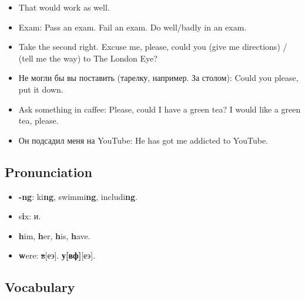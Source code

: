 \documentclass[10pt,a4paper]{article}
\newlength{\OriginalParIndent}
\newenvironment{ItemizeWithOrigParIndent}
    {\begin{itemize}[leftmargin=\OriginalParIndent]}
    {\end{itemize}}
\begin{document}
\begin{ItemizeWithOrigParIndent}
  \item That would work as well.
  \item Exam: Pass an exam. Fail an exam. Do well/badly in an exam.
  \item Take the second right. Excuse me, please, could you (give me directions) /
        (tell me the way) to The London Eye?
  \item Не могли бы вы поставить (тарелку, например. За столом): Could you please, put it down.
  \item Ask something in caffee: Please, could I have a green tea? I would like a green tea, please.
  \item Он подсадил меня на YouTube: He has got me addicted to YouTube.
\end{ItemizeWithOrigParIndent}



\subsection{Pronunciation}
\begin{ItemizeWithOrigParIndent}
  \item \textbf{-ng}: ki\textbf{ng}, swimmi\textbf{ng}, includi\textbf{ng}.
  \item s\textbf{i}x: и.
  \item \textbf{h}im, \textbf{h}er, \textbf{h}is, \textbf{h}ave.
  \item \textbf{w}ere: \sout{в}[еэ]. \textbf{у[вф]}[еэ].
\end{ItemizeWithOrigParIndent}



\subsection{Vocabulary}
\end{document}
